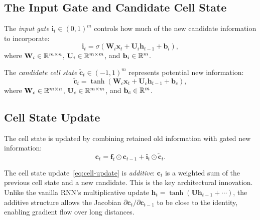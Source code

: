 \documentclass[11pt,a4paper]{article}
\begin{document}
\subsection{The Input Gate and Candidate Cell State}

\begin{definition}
\label{def:input-gate}
The \emph{input gate} $\mathbf{i}_t \in (0, 1)^m$ controls how much
of the new candidate information to incorporate:
\begin{equation}
  \boxed{\mathbf{i}_t = \sigma(\mathbf{W}_i \mathbf{x}_t +
    \mathbf{U}_i \mathbf{h}_{t-1} + \mathbf{b}_i)},
  \label{eq:input-gate}
\end{equation}
where $\mathbf{W}_i \in \mathbb{R}^{m \times n}$,
$\mathbf{U}_i \in \mathbb{R}^{m \times m}$, and
$\mathbf{b}_i \in \mathbb{R}^m$.
\end{definition}

\begin{definition}
\label{def:candidate}
The \emph{candidate cell state}
$\tilde{\mathbf{c}}_t \in (-1, 1)^m$ represents potential new
information:
\begin{equation}
  \boxed{\tilde{\mathbf{c}}_t = \tanh(\mathbf{W}_c \mathbf{x}_t +
    \mathbf{U}_c \mathbf{h}_{t-1} + \mathbf{b}_c)},
  \label{eq:candidate}
\end{equation}
where $\mathbf{W}_c \in \mathbb{R}^{m \times n}$,
$\mathbf{U}_c \in \mathbb{R}^{m \times m}$, and
$\mathbf{b}_c \in \mathbb{R}^m$.
\end{definition}

\subsection{Cell State Update}

\begin{definition}
\label{def:cell-update}
The cell state is updated by combining retained old information with
gated new information:
\begin{equation}
  \boxed{\mathbf{c}_t = \mathbf{f}_t \odot \mathbf{c}_{t-1} +
    \mathbf{i}_t \odot \tilde{\mathbf{c}}_t}.
  \label{eq:cell-update}
\end{equation}
\end{definition}

\begin{remark}
\label{rem:additive}
The cell state update~\eqref{eq:cell-update} is \emph{additive}:
$\mathbf{c}_t$ is a weighted sum of the previous cell state and a
new candidate.  This is the key architectural innovation.  Unlike the
vanilla RNN's multiplicative update
$\mathbf{h}_t = \tanh(\mathbf{U}\mathbf{h}_{t-1} + \cdots)$, the
additive structure allows the Jacobian
$\partial \mathbf{c}_t / \partial \mathbf{c}_{t-1}$ to be close to
the identity, enabling gradient flow over long distances.
\end{remark}
\end{document}
